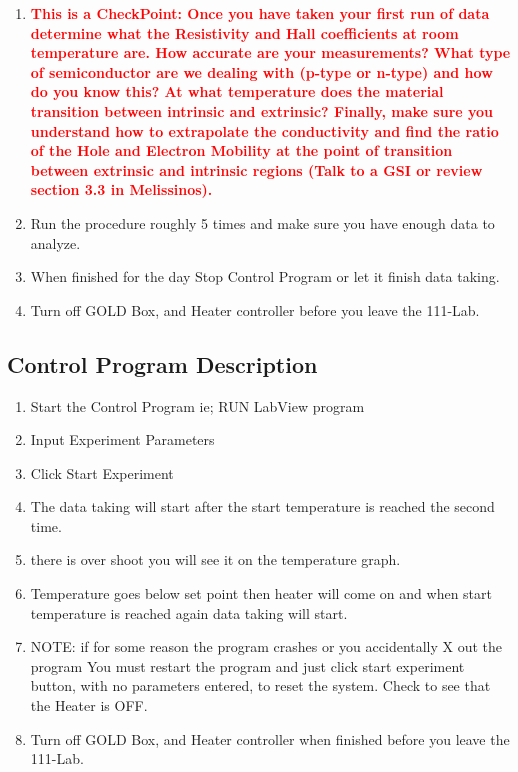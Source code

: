 \documentclass{../lab}
\begin{document}
\begin{enumerate}
    \item \textcolor{red}{\textbf{This is a CheckPoint: Once you have taken your first run of data determine what the Resistivity and Hall coefficients at room temperature are. How accurate are your measurements? What type of semiconductor are we dealing with (p-type or n-type) and how do you know this? At what temperature does the material transition between intrinsic and extrinsic? Finally, make sure you understand how to extrapolate the conductivity and find the ratio of the Hole and Electron Mobility at the point of transition between extrinsic and intrinsic regions (Talk to a GSI or review section 3.3 in Melissinos).}}

    \item Run the procedure roughly 5 times and make sure you have enough data to analyze.

    \item When finished for the day Stop Control Program or let it finish data taking.

    \item Turn off GOLD Box, and Heater controller before you leave the 111-Lab.
\end{enumerate}

\subsection{Control Program Description}

\begin{enumerate}
    \item Start the Control Program ie; RUN LabView program
    \item Input Experiment Parameters
    \item Click Start Experiment
    \item The data taking will start after the start temperature is reached the second time.
    \item there is over shoot you will see it on the temperature graph.
    \item Temperature goes below set point then heater will come on and when start temperature is reached again data taking will start.
    \item NOTE: if for some reason the program crashes or you accidentally X out the program You must restart the program and just click start experiment button, with no parameters entered, to reset the system. Check to see that the Heater is OFF.
    \item Turn off GOLD Box, and Heater controller when finished before you leave the 111-Lab.
\end{enumerate}
\end{document}
